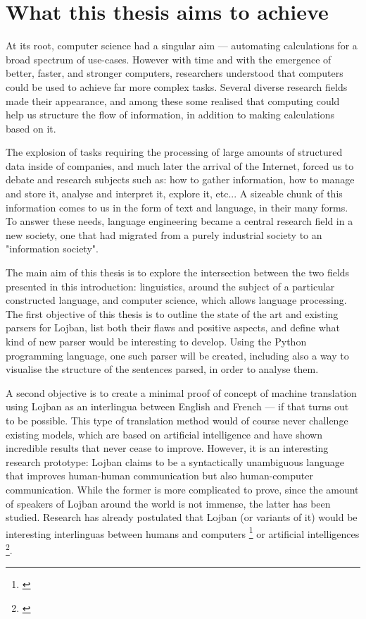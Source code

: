 \section{What this thesis aims to achieve}

At its root, computer science had a singular aim --- automating calculations for a broad spectrum of use-cases. However with time and with the emergence of better, faster, and
stronger computers, researchers understood that computers could be used to achieve far more complex tasks. Several diverse research fields made their appearance, and among these
some realised that computing could help us structure the flow of information, in addition to making calculations based on it. \newline

The explosion of tasks requiring the processing of large amounts of structured data inside of companies, and much later the arrival of the Internet, forced us to debate and
research subjects such as: how to gather information, how to manage and store it, analyse and interpret it, explore it, etc... A sizeable chunk of this information comes to us
in the form of text and language, in their many forms. To answer these needs, language engineering became a central research field in a new society, one that had migrated
from a purely industrial society to an "information society".\newline

The main aim of this thesis is to explore the intersection between the two fields presented in this introduction: linguistics, around the subject of a particular constructed
language, and computer science, which allows language processing. The first objective of this thesis is to outline the state of the art and existing parsers for Lojban, list both
their flaws and positive aspects, and define what kind of new parser would be interesting to develop. Using the Python programming language, one such parser will be created, including
also a way to visualise the structure of the sentences parsed, in order to analyse them.\newline

A second objective is to create a minimal proof of concept of machine translation using Lojban as an interlingua between English and French --- if that turns out to be possible.
This type of translation method would of course never challenge existing models, which are based on artificial intelligence and have shown incredible results that never cease to
improve. However, it is an interesting research prototype: Lojban claims to be a syntactically unambiguous language that improves human-human communication but also human-computer
communication. While the former is more complicated to prove, since the amount of speakers of Lojban around the world is not immense, the latter has been studied. Research has already
postulated that Lojban (or variants of it) would be interesting interlinguas between humans and computers \footnote{\cite{speer2004meeting}} or artificial
intelligences \footnote{\cite{goertzel2013lojban}}.
